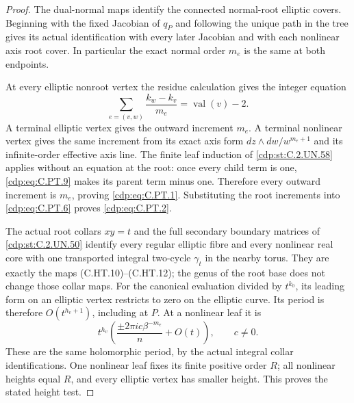 \begin{proof}
The dual-normal maps identify the connected
normal-root elliptic covers. Beginning with
the fixed Jacobian of $q_P$ and following the
unique path in the tree gives its actual
identification with every later Jacobian and
with each nonlinear axis root cover. In
particular the exact normal order $m_e$ is
the same at both endpoints.

At every elliptic nonroot vertex the residue
calculation gives the integer equation
\[
 \sum_{e=(v,w)}
       \frac{k_w-k_v}{m_e}
                        =\operatorname{val}(v)-2.
 \tag{C.PT.9}\label{cdp:eq:C.PT.9}
\]
A terminal elliptic vertex gives the outward
increment $m_e$. A terminal nonlinear vertex
gives the same increment from its exact
axis form $dz\wedge dw/w^{m_e+1}$ and its
infinite-order effective axis line.
The finite leaf induction of \ref{cdp:st:C.2.UN.58} applies
without an equation at the root: once every
child term is one, \eqref{cdp:eq:C.PT.9} makes its parent
term minus one. Therefore every outward
increment is $m_e$, proving \eqref{cdp:eq:C.PT.1}.
Substituting the root increments into
\eqref{cdp:eq:C.PT.6} proves \eqref{cdp:eq:C.PT.2}.

The actual root collars $xy=t$ and the full
secondary boundary matrices of \ref{cdp:st:C.2.UN.50} identify
every regular elliptic fibre and every
nonlinear real core with one transported
integral two-cycle $\gamma_t$ in the nearby
torus. They are exactly the maps
(C.HT.10)--(C.HT.12); the genus of the root
base does not change those collar maps.
For the canonical evaluation divided by
$t^{k_0}$, its leading form on an elliptic
vertex restricts to zero on the elliptic
curve. Its period is therefore
$O(t^{h_v+1})$, including at $P$.
At a nonlinear leaf it is
\[
 t^{h_v}
       \left(\frac{\pm2\pi i c\beta^{-m_e}}{n}
                         +O(t)\right),\qquad c\ne0.
 \tag{C.PT.10}\label{cdp:eq:C.PT.10}
\]
These are the same holomorphic period, by the
actual integral collar identifications.
One nonlinear leaf fixes its finite positive
order $R$; all nonlinear heights equal $R$,
and every elliptic vertex has smaller height.
This proves the stated height test.


\end{proof}
